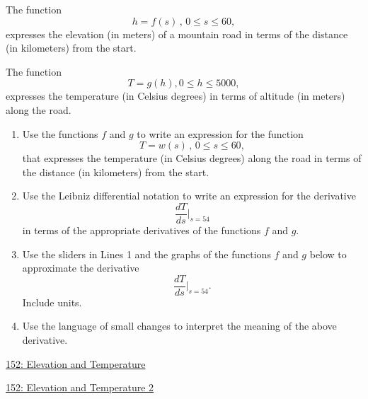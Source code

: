 \documentclass{ximera}
\begin{document}
\begin{question}  \label{Q9erKKe333}
The function
\[
   h = f(s) \, , \, 0\leq s \leq 60 ,
\]
expresses the elevation (in meters) of a mountain road in terms of the distance (in kilometers) from the start.

The function 
\[
    T = g(h) , 0\leq h \leq 5000 ,
\] 
expresses the temperature (in Celsius degrees) in terms of altitude (in meters) along the road.

\begin{enumerate}
\item Use the functions $f$ and $g$ to write an expression for the function
\[
 T = w(s) \, , \, 0\leq s \leq 60 ,
\]
that expresses the temperature (in Celsius degrees) along the road in terms of the distance (in kilometers) from the start.

\item Use the Leibniz differential notation to write an expression for the derivative
\[
  \frac{dT}{ds}\Big|_{s=54}
\]
in terms of the appropriate derivatives of the functions $f$ and $g$.

\item Use the sliders in Lines 1 and the graphs of the functions $f$ and $g$ below to approximate the derivative
\[
   \frac{dT}{ds}\Big|_{s=54} .
\]
Include units.

\item Use the language of small changes to interpret the meaning of the above derivative.
\end{enumerate}

\begin{onlineOnly}
    \begin{center}
\end{center}
\end{onlineOnly}

\href{https://www.desmos.com/calculator/gcmfa2a6jz}{152: Elevation and Temperature}

\begin{onlineOnly}
    \begin{center}
\end{center}
\end{onlineOnly}

\href{https://www.desmos.com/calculator/ohqk3ak539}{152: Elevation and Temperature 2}
\end{question}
\end{document}
